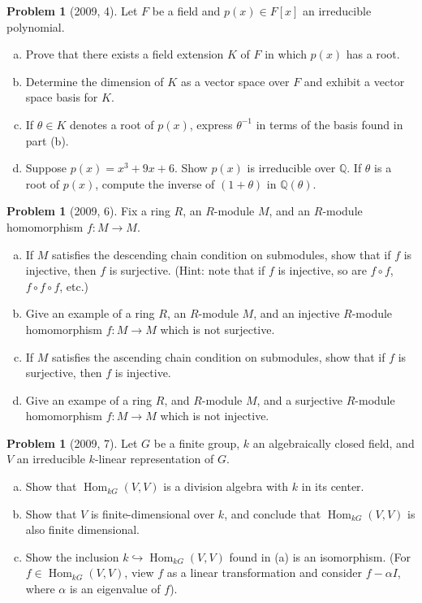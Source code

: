 \documentclass{article}
\newcommand{\inv}{^{-1}}
\newcommand{\<}{\langle} %
\renewcommand{\>}{\rangle} %
\DeclareMathOperator{\Hom}{Hom}
\theoremstyle{plain}
\theoremstyle{remark}
\theoremstyle{definition}
\newtheorem{examproblem}[equation]{Problem}
\begin{document}
\begin{examproblem}[2009, 4]
	Let $F$ be a field and $p(x)\in F[x]$ an irreducible polynomial.
	\begin{enumerate}[(a)]
		\item Prove that there exists a field extension $K$ of $F$
			in which $p(x)$ has a root.
		\item Determine the dimension of $K$ as a vector space over $F$
			and exhibit a vector space basis for $K$.
		\item If $\theta\in K$ denotes a root of $p(x)$, express
			$\theta\inv$ in terms of the basis found in part (b).
		\item Suppose $p(x)=x^3+9x+6$. Show $p(x)$ is irreducible over
			$\mathbb Q$. If $\theta$ is a root of $p(x)$, compute
			the inverse of $(1+\theta)$ in $\mathbb Q(\theta)$.
			\end{enumerate}
\end{examproblem}

\begin{examproblem}[2009, 6]
	Fix a ring $R$, an $R$-module $M$, and an $R$-module homomorphism
	$f:M\rightarrow M$.
	\begin{enumerate}[(a)]
		\item If $M$ satisfies the descending chain condition on submodules,
			show that if $f$ is injective, then $f$ is surjective.
			(Hint: note that if $f$ is injective, so are
			$f\circ f$, $f\circ f\circ f$, etc.)
		\item Give an example of a ring $R$, an $R$-module $M$,
			and an injective $R$-module homomorphism $f:M\rightarrow M$
			which is not surjective.
		\item If $M$ satisfies the ascending chain condition on submodules,
			show that if $f$ is surjective, then $f$ is injective.
		\item Give an exampe of a ring $R$, and $R$-module $M$, and
			a surjective $R$-module homomorphism $f:M\rightarrow M$
			which is not injective.
	\end{enumerate}
\end{examproblem}

\begin{examproblem}[2009, 7]
	Let $G$ be a finite group, $k$ an algebraically closed field, and $V$
	an irreducible $k$-linear representation of $G$.
	\begin{enumerate}[(a)]
		\item Show that $\Hom_{kG}(V,V)$ is a division algebra with $k$
			in its center.
		\item Show that $V$ is finite-dimensional over $k$, and conclude
			that $\Hom_{kG}(V,V)$ is also finite dimensional.
		\item Show the inclusion $k\hookrightarrow\Hom_{kG}(V,V)$ found
			in (a) is an isomorphism. (For $f\in\Hom_{kG}(V,V)$, view
			$f$ as a linear transformation and consider $f-\alpha I$,
			where $\alpha$ is an eigenvalue of $f$).
	\end{enumerate}
\end{examproblem}
\newpage
\end{document}
